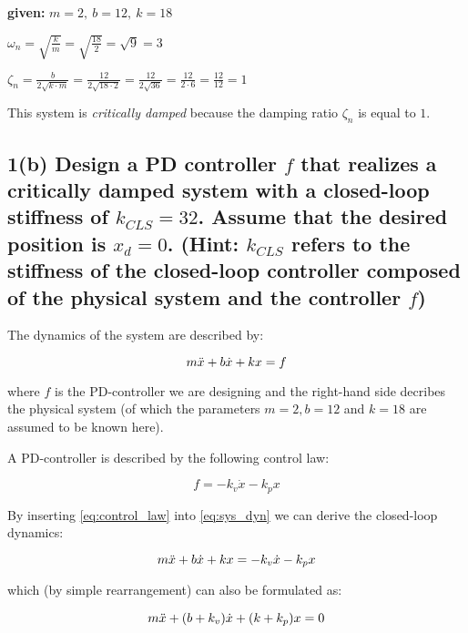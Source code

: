 \documentclass[a4paper,10pt]{article}
\begin{document}
\begin{flushright}
\textbf{given:} $m = 2,~b = 12,~k = 18$ 
\end{flushright}
    
$\omega_n = \sqrt{\frac{k}{m}} = \sqrt{\frac{18}{2}} = \sqrt{9} = 3$

$\zeta_n = \frac{b}{2\sqrt{k \cdot m}} = \frac{12}{2 \sqrt{18 \cdot 2}} = \frac{12}{2 \sqrt{36}} = \frac{12}{2 \cdot 6} = \frac{12}{12} = 1$

This system is \emph{critically damped} because the damping ratio $\zeta_n$ is equal to $1$.


\subsection*{1(b) Design a PD controller $f$ that realizes a critically damped system with a closed-loop stiffness of $k_{CLS} = 32$. Assume that the desired position is $x_d = 0$. (Hint: $k_{CLS}$ refers to the stiffness of the closed-loop controller composed of the physical system and the controller $f$)}

The dynamics of the system are described by:

\begin{equation}\label{eq:sys_dyn}
m\Ddot{x} + b\Dot{x} + kx = f
\end{equation}

where $f$ is the PD-controller we are designing and the right-hand side decribes the physical system (of which the parameters $m = 2, b = 12$ and $k = 18$ are assumed to be known here).

A PD-controller is described by the following control law:

\begin{equation}\label{eq:control_law}
f = -k_v\Dot{x} - k_px
\end{equation}

By inserting \eqref{eq:control_law} into \eqref{eq:sys_dyn} we can derive the closed-loop dynamics:

\begin{equation}
m\Ddot{x} + b\Dot{x} + kx = -k_v\Dot{x} - k_px
\end{equation}

which (by simple rearrangement) can also be formulated as:

\begin{equation}
m\Ddot{x} + (b+k_v)\Dot{x} + (k+k_p)x = 0
\end{equation}
\end{document}
